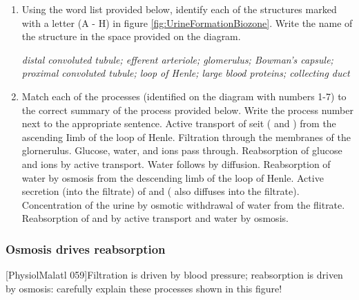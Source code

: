 \begin{enumerate}[resume, leftmargin=*]
\item  Using the word list provided below, identify each of the structures marked with a letter (A - H) in figure \ref{fig:UrineFormationBiozone}. Write the name of the structure in the space provided on the diagram. 

	\emph{ distal convoluted tubule;  efferent arteriole;  glomerulus;  Bowman's capsule;  proximal convoluted tubule;  loop of Henle;  large blood proteins;  collecting duct }
	
\item Match each of the processes (identified on the diagram with numbers 1-7) to the correct summary of the process provided below. Write the process number next to the appropriate sentence. 
    Active transport of seit (  and  ) from the ascending Iimb of the loop of Henle. 
    Filtration through the membranes of the glornerulus. Glucose, water, and ions pass through. 
    Reabsorption of glucose and ions by active transport. Water follows by diffusion. 
    Reabsorption of water by osmosis from the descending limb of the loop of Henle. 
    Active secretion (into the filtrate) of   and  (   also diffuses into the filtrate). 
   Concentration of the urine by osmotic withdrawal of water from the flitrate. 
    Reabsorption of   and   by active transport and water by osmosis. 

\end{enumerate}

	 \areaset[0cm]{13cm}{27.4cm}  

\begin{landscape}

\subsubsection{Osmosis drives reabsorption}
\hspace{4 em} 
	
	\begin{minipage}[p]{20cm}
		   [PhysiolMalatl 059]{Filtration is driven by blood pressure; reabsorption is driven by osmosis: carefully explain these processes shown in this figure!}  	\label{fig:Filtration}
	\end{minipage}
 
\end{landscape}

